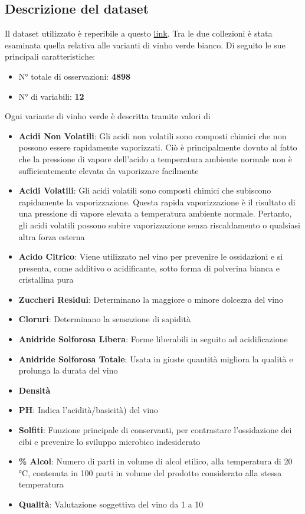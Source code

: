 \documentclass[12pt]{article}
\begin{document}
\subsection{Descrizione del dataset}
Il dataset utilizzato è reperibile a questo \href{https://archive.ics.uci.edu/ml/datasets/Wine+Quality}{link}. Tra le due collezioni è stata esaminata quella relativa alle varianti di vinho verde bianco.
Di seguito le sue principali caratteristiche:
\begin{itemize}
    \item N° totale di osservazioni: \textbf{4898}
    \item N° di variabili: \textbf{12}
\end{itemize}
Ogni variante di vinho verde è descritta tramite valori di
\begin{itemize}
    \item \textbf{Acidi Non Volatili}: Gli acidi non volatili sono composti chimici che non possono essere rapidamente vaporizzati. Ciò è principalmente dovuto al fatto che la pressione di vapore dell'acido a temperatura ambiente normale non è sufficientemente elevata da vaporizzare facilmente
    \item \textbf{Acidi Volatili}: Gli acidi volatili sono composti chimici che subiscono rapidamente la vaporizzazione. Questa rapida vaporizzazione è il risultato di una pressione di vapore elevata a temperatura ambiente normale. Pertanto, gli acidi volatili possono subire vaporizzazione senza riscaldamento o qualsiasi altra forza esterna
    \item \textbf{Acido Citrico}: Viene utilizzato nel vino per prevenire le ossidazioni e si presenta, come additivo o acidificante, sotto forma di polverina bianca e cristallina pura
    \item \textbf{Zuccheri Residui}: Determinano la maggiore o minore dolcezza del vino
    \item \textbf{Cloruri}: Determinano la sensazione di sapidità
    \item \textbf{Anidride Solforosa Libera}: Forme liberabili in seguito ad acidificazione
    \item \textbf{Anidride Solforosa Totale}: Usata in giuste quantità migliora la qualità e prolunga la durata del vino
    \item \textbf{Densità}
    \item \textbf{PH}: Indica l'acidità/basicità) del vino
    \item \textbf{Solfiti}: Funzione principale di conservanti, per contrastare l’ossidazione dei cibi e prevenire lo sviluppo microbico indesiderato
    \item \textbf{\% Alcol}: Numero di parti in volume di alcol etilico, alla temperatura di 20 °C, contenuta in 100 parti in volume del prodotto considerato alla stessa temperatura
    \item \textbf{Qualità}: Valutazione soggettiva del vino da 1 a 10
\end{itemize}
\end{document}

